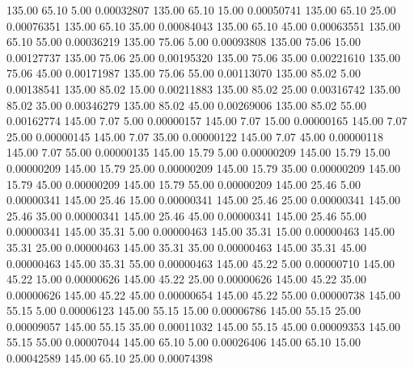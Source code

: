     135.00     65.10      5.00     0.00032807
    135.00     65.10     15.00     0.00050741
    135.00     65.10     25.00     0.00076351
    135.00     65.10     35.00     0.00084043
    135.00     65.10     45.00     0.00063551
    135.00     65.10     55.00     0.00036219
    135.00     75.06      5.00     0.00093808
    135.00     75.06     15.00     0.00127737
    135.00     75.06     25.00     0.00195320
    135.00     75.06     35.00     0.00221610
    135.00     75.06     45.00     0.00171987
    135.00     75.06     55.00     0.00113070
    135.00     85.02      5.00     0.00138541
    135.00     85.02     15.00     0.00211883
    135.00     85.02     25.00     0.00316742
    135.00     85.02     35.00     0.00346279
    135.00     85.02     45.00     0.00269006
    135.00     85.02     55.00     0.00162774
    145.00      7.07      5.00     0.00000157
    145.00      7.07     15.00     0.00000165
    145.00      7.07     25.00     0.00000145
    145.00      7.07     35.00     0.00000122
    145.00      7.07     45.00     0.00000118
    145.00      7.07     55.00     0.00000135
    145.00     15.79      5.00     0.00000209
    145.00     15.79     15.00     0.00000209
    145.00     15.79     25.00     0.00000209
    145.00     15.79     35.00     0.00000209
    145.00     15.79     45.00     0.00000209
    145.00     15.79     55.00     0.00000209
    145.00     25.46      5.00     0.00000341
    145.00     25.46     15.00     0.00000341
    145.00     25.46     25.00     0.00000341
    145.00     25.46     35.00     0.00000341
    145.00     25.46     45.00     0.00000341
    145.00     25.46     55.00     0.00000341
    145.00     35.31      5.00     0.00000463
    145.00     35.31     15.00     0.00000463
    145.00     35.31     25.00     0.00000463
    145.00     35.31     35.00     0.00000463
    145.00     35.31     45.00     0.00000463
    145.00     35.31     55.00     0.00000463
    145.00     45.22      5.00     0.00000710
    145.00     45.22     15.00     0.00000626
    145.00     45.22     25.00     0.00000626
    145.00     45.22     35.00     0.00000626
    145.00     45.22     45.00     0.00000654
    145.00     45.22     55.00     0.00000738
    145.00     55.15      5.00     0.00006123
    145.00     55.15     15.00     0.00006786
    145.00     55.15     25.00     0.00009057
    145.00     55.15     35.00     0.00011032
    145.00     55.15     45.00     0.00009353
    145.00     55.15     55.00     0.00007044
    145.00     65.10      5.00     0.00026406
    145.00     65.10     15.00     0.00042589
    145.00     65.10     25.00     0.00074398
